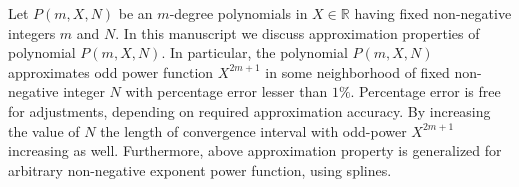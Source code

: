 Let $P(m, X, N)$ be an $m$-degree polynomials in $X\in\mathbb{R}$
having fixed non-negative integers $m$ and $N$.
In this manuscript we discuss approximation properties of polynomial $P(m,X,N)$.
In particular, the polynomial $P(m,X,N)$ approximates odd power function $X^{2m+1}$ in some neighborhood
of fixed non-negative integer $N$ with percentage error lesser than $1\%$.
Percentage error is free for adjustments, depending on required approximation accuracy.
By increasing the value of $N$ the length of convergence interval with odd-power $X^{2m+1}$ increasing as well.
Furthermore, above approximation property is generalized for arbitrary non-negative exponent power function, using splines.
